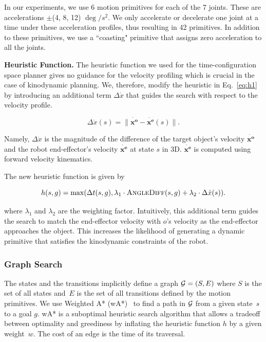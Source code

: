 \documentclass[a4paper]{report}
\begin{document}
In our experiments, we use 6 motion primitives for each of the 7 joints. These are accelerations $\pm$(4, 8, 12) $\deg/s^2$. We only accelerate or decelerate one joint at a time under these acceleration profiles, thus resulting in 42 primitives. In addition to these primitives, we use a ``coasting" primitive that assigns zero acceleration to all the joints.

\textbf{Heuristic Function.}
The heuristic function we used for the time-configuration space planner gives no guidance for the velocity profiling which is crucial in the case of kinodynamic planning. We, therefore, modify the heuristic in Eq.~\ref{eq:h1} by introducing an additional term $\Delta \dot{x}$ that guides the search with respect to the velocity profile.

\begin{equation}
\Delta \dot{x}(s) = \|\mathbf{\dot{x^o} - \dot{x^e}}(s)\|.
\end{equation}

Namely, $\Delta \dot{x}$ is the magnitude of the difference of the target object's velocity $\mathbf{\dot{x^o}}$ and the robot end-effector's velocity $\mathbf{\dot{x^e}}$ at state $s$ in 3D. $\mathbf{\dot{x^e}}$ is computed using forward velocity kinematics.

The new heuristic function is given by


$$
 h(s,g) = \max (\Delta t(s,g),
 \lambda_1 \cdot \textsc{AngleDiff}(s,g) + \lambda_2 \cdot \Delta \dot{x}(s)).
 $$


where $\lambda_1$ and $\lambda_2$ are the weighting factor. Intuitively, this additional term guides the search to match the end-effector velocity with $o$'s velocity as the end-effector approaches the object. This increases the likelihood of generating a dynamic primitive that satisfies the kinodynamic constraints of the robot. 

\subsubsection{Graph Search}
The states and the transitions implicitly define a graph $\mathcal{G} = (S,E)$ where $S$ is the set of all states and~$E$ is the set of all transitions defined by the motion primitives. We use Weighted A* (wA*)~\cite{pohl1970heuristic} to find a path in $\mathcal{G}$ from a given state~$s$ to a goal $g$. 
wA* is a suboptimal heuristic search algorithm that allows a tradeoff between optimality and greediness by inflating the heuristic function $h$ by a given weight~$w$. The cost of an edge is the time of its traversal.
\end{document}
